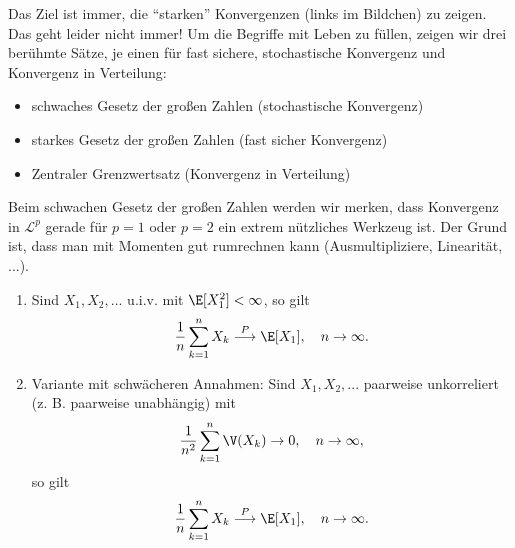 	Das Ziel ist immer, die \enquote{starken} Konvergenzen (links im Bildchen) zu zeigen. Das geht leider nicht immer! Um die Begriffe mit Leben zu f\"ullen, zeigen wir drei ber\"uhmte S\"atze, je einen f\"ur fast sichere, stochastische Konvergenz und Konvergenz in Verteilung:
\begin{itemize}
	\item schwaches Gesetz der gro\ss en Zahlen (stochastische Konvergenz)
	\item starkes Gesetz der gro\ss en Zahlen (fast sicher Konvergenz)
	\item Zentraler Grenzwertsatz (Konvergenz in Verteilung)
\end{itemize}
Beim schwachen Gesetz der gro\ss en Zahlen werden wir merken, dass Konvergenz in $\mathcal L^p$ gerade f\"ur $p=1$ oder $p=2$ ein extrem n\"utzliches Werkzeug ist. Der Grund ist, dass man mit Momenten gut rumrechnen kann (Ausmultipliziere, Linearit\"at, ...). 

\begin{satz}\label{schwaches}\abs
	\begin{enumerate}[label=(\roman*)]
		\item Sind $X_1,X_2,...$ u.i.v. mit $\E[X_1^2] < \infty$, so gilt
		\[ \frac{1}{n} \sum_{k=1}^{n} X_k \overset{P}{\longrightarrow} \E[X_1], \quad n \to \infty. \]
		\item Variante mit schw\"acheren Annahmen: Sind $X_1,X_2,...$ paarweise unkorreliert (z. B. paarweise unabh\"angig) mit 
		\begin{align}
		 \frac{1}{n^2} \sum\limits_{k=1}^{n} \V(X_k) \to 0,\quad n\to\infty, \label{F1}
		\end{align}
		so gilt
		\[ \frac{1}{n} \sum_{k=1}^{n} X_k \overset{P}{\longrightarrow} \E[X_1], \quad n \to \infty. \]
	\end{enumerate}
\end{satz}

